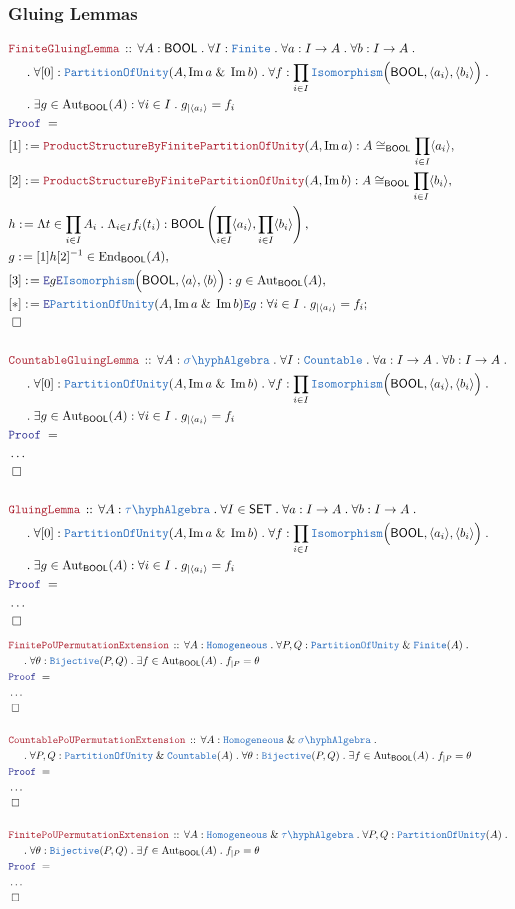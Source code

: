 \documentclass[12pt]{scrartcl}
\newcommand{\TYPE}[1]{\textcolor{NavyBlue}{\mathtt{#1}}}
\newcommand{\LOGIC}[1]{\textcolor{Blue}{\mathtt{#1}}}
\newcommand{\THM}[1]{\textcolor{Maroon}{\mathtt{#1}}}
\renewcommand{\.}{\; . \;}
\newcommand{\de}{: \kern 0.1pc =}
\newcommand{\Theorem}[2]{& \THM{#1} \, :: \, #2 \\ & \Proof = \\ }
\newcommand{\NewLine}{\\ & \kern 1pc}
\newcommand{\Page}[1]{ \begin{align*} #1 \end{align*}   }
\newcommand{\NoProof}{ & \ldots \\ \EndProof}
\renewcommand{\And}{\; \& \;}
\newcommand{\Elim}{\LOGIC{E}}
\DeclareMathOperator*{\im}{Im}
\newcommand{\End}{\mathrm{End}}
\newcommand{\Aut}{\mathrm{Aut}}
\newcommand{\Bij}{\TYPE{Bijective}}
\newcommand{\Say}[3]{& #1 \de #2 : #3, \\}
\newcommand{\SayIn}[3]{& #1 \de #2 \in #3, \\}
\newcommand{\Conclude}[3]{& #1 \de #2 : #3; \\}
\newcommand{\QED}{\; \square}
\newcommand{\EndProof}{& \QED \\}
\newcommand{\Proof}{\LOGIC{Proof} \; }
\newcommand{\Finite}{\TYPE{Finite}}
\newcommand{\SA}{\TYPE{\sigma \hyph Algebra}}
\newcommand{\SET}{\mathsf{SET}}
\newcommand{\PoU}{\TYPE{PartitionOfUnity}}
\newcommand{\TAlgebra}{\TYPE{\tau\hyph Algebra}}
\newcommand{\Homog}{\TYPE{Homogeneous}}
\newcommand{\BOOL}{\mathsf{BOOL}}
\begin{document}
\subsubsection{Gluing Lemmas}
\Page{
	\Theorem{FiniteGluingLemma}
	{
		\forall A : \BOOL \.
		\forall I : \Finite \.
		\forall a : I \to A \.
		\forall b : I \to A \.
		\NewLine \.
		\forall [0] : \PoU(A,\im a \And \im b) \.
		\forall f : \prod_{i \in I} \TYPE{Isomorphism}\Big( \BOOL, 
			\langle a_i \rangle, 
			\langle b_i \rangle 
		\Big) \.
		\NewLine \.
		\exists g \in \Aut_\BOOL(A) : \forall i \in I \. g_{|\langle a_i \rangle} = f_i	
	}
	\Say{[1]}{\THM{ProductStructureByFinitePartitionOfUnity}(A,\im a)}
	{
		A \cong_\BOOL \prod_{i \in I} \langle a_i \rangle
	}
	\Say{[2]}{\THM{ProductStructureByFinitePartitionOfUnity}(A,\im b)}
	{
		A \cong_\BOOL \prod_{i \in I} \langle b_i \rangle
	}
	\Say{h}
	{
		\Lambda t \in \prod_{i \in I} A_i \.  
		\Lambda_{i \in I} f_i(t_i)	
	}
	{
		\BOOL\left( 
			\prod_{i \in I} \langle a_i \rangle,
			\prod_{i \in I} \langle b_i \rangle
		\right)
	}
	\SayIn{g}{[1]h[2]^{-1}}{\End_\BOOL(A)}
	\Say{[3]}{
		\Elim g		
		\Elim \TYPE{Isomorphism}\Big( 
			\BOOL, 
			\langle a \rangle,
			\langle b \rangle 
		\Big)}
	{
		g \in \Aut_\BOOL(A)
	}
	\Conclude{[*]}{\Elim \PoU(A,\im a \And \im b) \Elim g }
	{
		\forall i \in I \. g_{|\langle a_i \rangle} = f_i
	}
	\EndProof
	\\
	\Theorem{CountableGluingLemma}
	{
		\forall A : \SA \.
		\forall I : \TYPE{Countable} \.
		\forall a : I \to A \.
		\forall b : I \to A \.
		\NewLine \.
		\forall [0] : \PoU(A,\im a \And \im b) \.
		\forall f : \prod_{i \in I} \TYPE{Isomorphism}\Big( \BOOL, 
			\langle a_i \rangle, 
			\langle b_i \rangle 
		\Big) \.
		\NewLine \.
		\exists g \in \Aut_\BOOL(A) : \forall i \in I \. g_{|\langle a_i \rangle} = f_i	
	}
	\NoProof
	\\
	\Theorem{GluingLemma}
	{
		\forall A : \TAlgebra \.
		\forall I \in \SET \.
		\forall a : I \to A \.
		\forall b : I \to A \.
		\NewLine \.
		\forall [0] : \PoU(A,\im a \And \im b) \.
		\forall f : \prod_{i \in I} \TYPE{Isomorphism}\Big( \BOOL, 
			\langle a_i \rangle, 
			\langle b_i \rangle 
		\Big) \.
		\NewLine \.
		\exists g \in \Aut_\BOOL(A) : \forall i \in I \. g_{|\langle a_i \rangle} = f_i	
	}
	\NoProof
}
\Page{
	\Theorem{FinitePoUPermutationExtension}
	{
		\forall A : \Homog \.
		\forall P,Q : \PoU \And \Finite(A)  \. \NewLine \.
		\forall \theta : \Bij(P,Q) \.
		\exists f \in \Aut_\BOOL(A) \.
		f_{|P} = \theta
	}
	\NoProof
	\\
	\Theorem{CountablePoUPermutationExtension}
	{
		\forall A : \Homog \And \SA \. \NewLine \.
		\forall P,Q : \PoU \And \TYPE{Countable}(A) \. 
		\forall \theta : \Bij(P,Q) \.
		\exists f \in \Aut_\BOOL(A) \.
		f_{|P} = \theta
	}
	\NoProof
	\\
	\Theorem{FinitePoUPermutationExtension}
	{
		\forall A : \Homog \And \TAlgebra \.
		\forall P,Q : \PoU(A) \. \NewLine \.
		\forall \theta : \Bij(P,Q) \.
		\exists f \in \Aut_\BOOL(A) \.
		f_{|P} = \theta
	}
	\NoProof
}
\newpage
\end{document}
